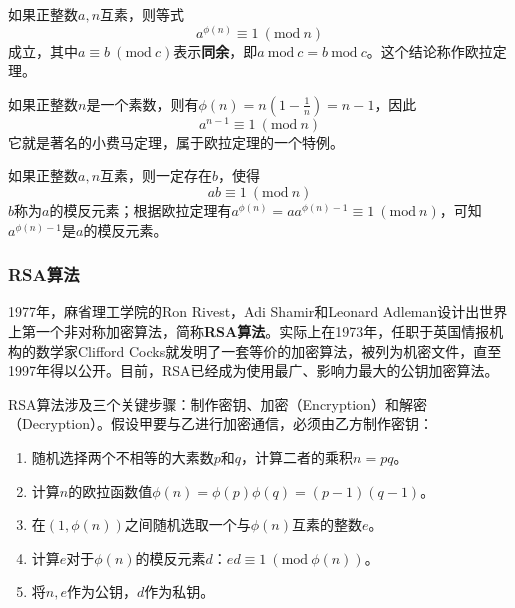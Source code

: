 \begin{theorem}
    如果正整数$a,n$互素，则等式
    \begin{equation}
        a^{\phi(n)}\equiv 1~(\text{mod}~n)
    \end{equation}
    成立，其中$a\equiv b~(\text{mod}~c)$表示\textbf{同余}，即$a~\text{mod}~c = b~\text{mod}~c$。这个结论称作欧拉定理。

    如果正整数$n$是一个素数，则有$\phi(n)=n(1-\frac{1}{n}) = n - 1$，因此
    \begin{equation}
        a^{n-1}\equiv 1~(\text{mod}~n)
    \end{equation}
    它就是著名的小费马定理，属于欧拉定理的一个特例。
\end{theorem}

\begin{theorem}
    如果正整数$a,n$互素，则一定存在$b$，使得
    \begin{equation}
        ab \equiv 1~(\text{mod}~n)
    \end{equation}
    $b$称为$a$的模反元素；根据欧拉定理有$a^{\phi(n)}=a a^{\phi(n)-1}\equiv 1~(\text{mod}~n)$，可知$a^{\phi(n)-1}$是$a$的模反元素。
\end{theorem}

\subsubsection{RSA算法}
1977年，麻省理工学院的Ron Rivest，Adi Shamir和Leonard Adleman设计出世界上第一个非对称加密算法，简称\textbf{RSA算法}。实际上在1973年，任职于英国情报机构的数学家Clifford Cocks就发明了一套等价的加密算法，被列为机密文件，直至1997年得以公开。目前，RSA已经成为使用最广、影响力最大的公钥加密算法。

RSA算法涉及三个关键步骤：制作密钥、加密（Encryption）和解密（Decryption）。假设甲要与乙进行加密通信，必须由乙方制作密钥：
\begin{enumerate}
  \item 随机选择两个不相等的大素数$p$和$q$，计算二者的乘积$n=pq$。
  \item 计算$n$的欧拉函数值$\phi(n)=\phi(p)\phi(q)=(p-1)(q-1)$。
  \item 在$(1,\phi(n))$之间随机选取一个与$\phi(n)$互素的整数$e$。
  \item 计算$e$对于$\phi(n)$的模反元素$d$：$ed\equiv 1~(\text{mod}~\phi(n))$。
  \item 将$n,e$作为公钥，$d$作为私钥。
\end{enumerate}


